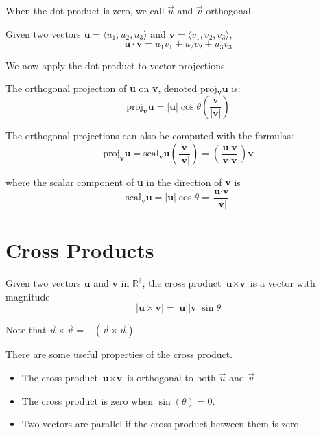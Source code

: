 \documentclass[../calc3.tex]{subfiles}
\begin{document}
When the dot product is zero, we call $\vec{u}$ and $\vec{v}$ orthogonal.
\begin{theorem}
    Given two vectors $\textbf{u}=\langle u_1, u_2, u_3 \rangle$ and $\textbf{v}=\langle v_1, v_2, v_3 \rangle$,
    \[\textbf{u}\cdot\textbf{v}=u_1v_1+u_2v_2+u_3v_3\]
\end{theorem}

We now apply the dot product to vector projections.
\begin{definition}
    The orthogonal projection of \textbf{u} on \textbf{v}, denoted proj$_{\textbf{v}}\textbf{u}$ is:
    \[\text{proj}_{\textbf{v}}\textbf{u}=|\textbf{u}|\cos\theta\left(\frac{\textbf{v}}{|\textbf{v}|}\right)\]

    The orthogonal projections can also be computed with the formulas:
    \[\text{proj}_{\textbf{v}}\textbf{u}=\text{scal}_{\textbf{v}}\textbf{u}\left(\frac{\textbf{v}}{|\textbf{v}|}\right)=
    \left(\frac{\textbf{u}\cdot\textbf{v}}{\textbf{v}\cdot\textbf{v}}\right)\textbf{v}\]
    
    where the scalar component of \textbf{u} in the direction of \textbf{v} is 
    \[\text{scal}_{\textbf{v}}\textbf{u}=|\textbf{u}|\cos\theta = \frac{\textbf{u}\cdot\textbf{v}}{|\textbf{v}|}\]
\end{definition}

\section{Cross Products}
\begin{definition}
    Given two vectors $\textbf{u}$ and $\textbf{v}$ in $\mathbb{R}^3$, the cross product $\textbf{u}\times\textbf{v}$ 
    is a vector with magnitude
        \[|\textbf{u}\times\textbf{v}|=|\textbf{u}||\textbf{v}|\sin\theta\]
\end{definition}

Note that $\vec{u}\times\vec{v}=-(\vec{v}\times\vec{u})$

There are some useful properties of the cross product.
\begin{itemize}
    \item The cross product $\textbf{u}\times\textbf{v}$ is orthogonal to both $\vec{u}$ and $\vec{v}$
    \item The cross product is zero when $\sin(\theta)=0$.
    \item Two vectors are parallel if the cross product between them is zero.
\end{itemize}
\end{document}
